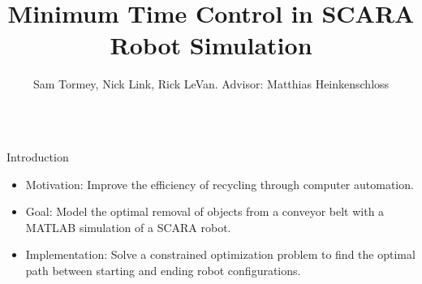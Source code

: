 \documentclass[final]{beamer}
\title[Fancy Posters]{Minimum Time Control in SCARA Robot Simulation}
\author{Sam Tormey, Nick Link, Rick LeVan. Advisor: Matthias Heinkenschloss}
\institute{Department of Computational and Applied Mathematics, Rice University}
\begin{document}
        \begin{frame}{}
        
        \vfill
        \vspace{-1.5cm}
{\footnotesize
\begin{columns}[t]
        
\hspace{0.7cm}
\begin{column}{.30\linewidth}
                
\begin{block}{\centering Introduction}
		




\begin{itemize}
	\setlength{\itemindent}{0.32in}
	\item Motivation: Improve the efficiency of recycling through computer automation.
	\item Goal: Model the optimal removal of objects from a conveyor belt with a MATLAB simulation of a SCARA robot.
	\item Implementation: Solve a constrained optimization problem to find the optimal path between starting and
ending robot configurations. 
\end{itemize}


\end{block}
\end{column}
\end{columns}}
\end{frame}
\end{document}
